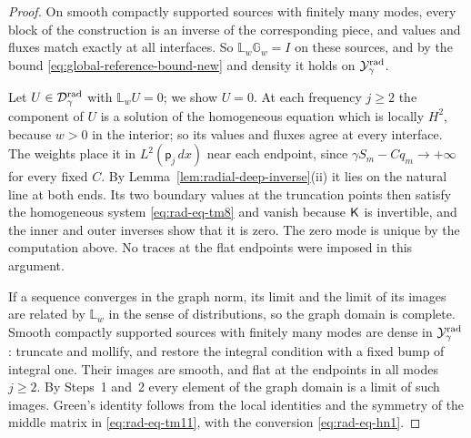 \begin{proof}
On smooth compactly supported sources with finitely many modes, every
block of the construction is an inverse of the corresponding piece,
and values and fluxes match exactly at all interfaces. So
$\mathbb L_w\mathbb G_w=I$ on these sources, and by the bound
\eqref{eq:global-reference-bound-new} and density it holds on
$\mathcal Y_\gamma^{\rm rad}$.

Let $U\in\mathcal D_\gamma^{\rm rad}$ with $\mathbb L_wU=0$; we show
$U=0$. At each frequency $j\ge2$ the component of $U$ is a solution
of the homogeneous equation which is locally $H^2$, because $w>0$ in
the interior; so its values and fluxes agree at every interface. The
weights place it in $L^2(\mathsf p_j\,dx)$ near each endpoint, since
$\gamma S_m-Cq_m\to+\infty$ for every fixed $C$. By
Lemma~\ref{lem:radial-deep-inverse}(ii) it lies on the natural line
at both ends. Its two boundary values at the truncation points then
satisfy the homogeneous system \eqref{eq:rad-eq-tm8} and vanish
because $\mathsf K$ is invertible, and the inner and outer inverses show
that it is zero. The zero mode is unique by the computation above.
No traces at the flat endpoints were imposed in this argument.

If a sequence converges in the graph norm, its limit and the limit of
its images are related by $\mathbb L_w$ in the sense of
distributions, so the graph domain is complete. Smooth compactly
supported sources with finitely many modes are dense in
$\mathcal Y_\gamma^{\rm rad}$: truncate and mollify, and restore the
integral condition with a fixed bump of integral one. Their images
are smooth, and flat at the endpoints in all modes $j\ge2$. By
Steps~1 and~2 every element of the graph domain is a limit of such
images. Green's identity follows from the local identities and the
symmetry of the middle matrix in \eqref{eq:rad-eq-tm11}, with the
conversion \eqref{eq:rad-eq-hn1}.
\end{proof}

